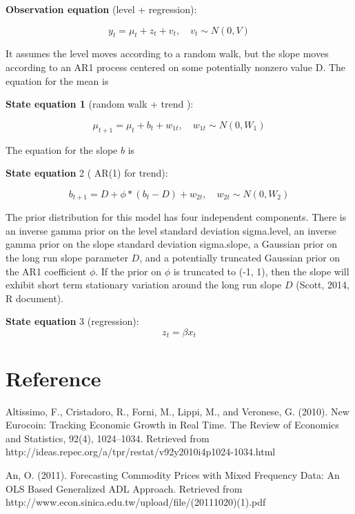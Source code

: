 \textbf{Observation equation} (level + regression): 



$$y_t = \mu_t + z_t + v_{t}, \quad v_{t} \sim N(0, V)$$



It assumes the level moves according to a random walk, but the slope moves according to an AR1 process centered on some potentially nonzero value D. The equation for the mean is


\textbf{State equation 1} (random walk + trend ):  



$$\mu_{t+1} = \mu_{t} + b_{t} +  w_{1t}, \quad w_{1t} \sim N(0, W_{1})$$



The equation for the slope $b$  is



\textbf{State equation} 2 ( AR(1) for trend):  



$$b_{t+1} = D + \phi * (b_t - D) + w_{2t}, \quad w_{2t} \sim N(0, W_{2})$$



The prior distribution for this model has four independent components. There is an inverse gamma prior on the level standard deviation sigma.level, an inverse gamma prior on the slope standard deviation sigma.slope, a Gaussian prior on the long run slope parameter $D$, and a potentially truncated Gaussian prior on the AR1 coefficient $\phi$. If the prior on $\phi$ is truncated to (-1, 1), then the slope will exhibit short term stationary variation around the long run slope $D$ (Scott, 2014, R document).




\textbf{State equation} 3 (regression): $$z_t = \beta x_t$$




\section{Reference}



Altissimo, F., Cristadoro, R., Forni, M., Lippi, M., and Veronese, G. (2010). New Eurocoin: Tracking Economic Growth in Real Time. The Review of Economics and Statistics, 92(4), 1024–1034. Retrieved from http://ideas.repec.org/a/tpr/restat/v92y2010i4p1024-1034.html



An, O. (2011). Forecasting Commodity Prices with Mixed Frequency Data: An OLS Based Generalized ADL Approach. Retrieved from http://www.econ.sinica.edu.tw/upload/file/(20111020)(1).pdf



